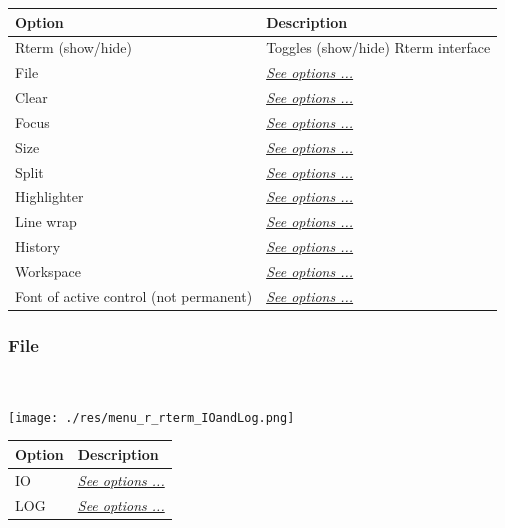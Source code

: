 \begin{scriptsize}
  \begin{tabularx}{\textwidth}{>{\hsize=0.7\hsize}X>{\hsize=0.7\hsize}X}\\
    \hline
    \textbf{Option} & \textbf{Description} \\
    \hline
    Rterm (show/hide) & Toggles (show/hide) Rterm interface \\
    File & \textit{\href{\#menu\_r\_rterm\_file}{See options ...}} \\
    Clear & \textit{\href{\#menu\_r\_rterm\_clear}{See options ...}} \\
    Focus & \textit{\href{\#menu\_r\_rterm\_focus}{See options ...}} \\
    Size & \textit{\href{\#menu\_r\_rterm\_size}{See options ...}} \\
    Split & \textit{\href{\#menu\_r\_rterm\_split}{See options ...}} \\
    Highlighter & \textit{\href{\#menu\_r\_rterm\_highlighter}{See options ...}} \\
    Line wrap & \textit{\href{\#menu\_r\_rterm\_linewrap}{See options ...}} \\
    History & \textit{\href{\#menu\_r\_rterm\_history}{See options ...}} \\
    Workspace & \textit{\href{\#menu\_r\_rterm\_workspace}{See options ...}} \\
    Font of active control (not permanent) & \textit{\href{\#menu\_r\_rterm\_fontsize}{See options ...}} \\
    \hline
  \end{tabularx}
\end{scriptsize}


\hypertarget{menu_r_rterm_file}{}
\subsubsection{File}\\

\texttt{[image: ./res/menu\_r\_rterm\_IOandLog.png]}\\

\begin{scriptsize}
  \begin{tabularx}{\textwidth}{>{\hsize=0.3\hsize}X>{\hsize=0.7\hsize}X}\\
    \hline
    \textbf{Option} & \textbf{Description} \\
    \hline
    IO & \textit{\href{\#menu\_r\_rterm\_file\_IO}{See options ...}} \\
    LOG & \textit{\href{\#menu\_r\_rterm\_file\_Log}{See options ...}} \\
    \hline
  \end{tabularx}
\end{scriptsize}


